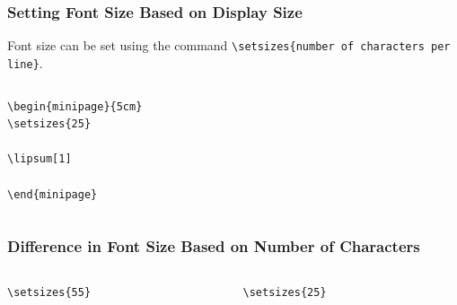 \begin{frame}[fragile]
  \frametitle{Setting Font Size Based on Display Size}

  Font size can be set using the command \verb|\setsizes{number of characters per line}|.
  
\begin{columns}
  \begin{column}{0.5\textwidth}
\begin{verbatim}
\begin{minipage}{5cm}
\setsizes{25}

\lipsum[1]

\end{minipage}
\end{verbatim}
\end{column}
\begin{column}{0.5\textwidth}

\end{column}
\end{columns}

\end{frame}

\begin{frame}[fragile]
  \frametitle{Difference in Font Size Based on Number of Characters}
\begin{columns}
  \begin{column}{0.5\textwidth}
\begin{verbatim}
\setsizes{55}
\end{verbatim}

\end{column}
\begin{column}{0.5\textwidth}
\begin{verbatim}
\setsizes{25}
\end{verbatim}

\end{column}
\end{columns}
\end{frame}

